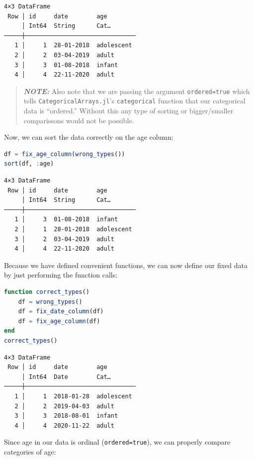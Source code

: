 \documentclass[
  notoc %
]{tufte-book}
\newcommand{\passthrough}[1]{#1}
\begin{document}
\begin{lstlisting}[language=Output]
4×3 DataFrame
 Row │ id     date        age
     │ Int64  String      Cat…
─────┼───────────────────────────────
   1 │     1  28-01-2018  adolescent
   2 │     2  03-04-2019  adult
   3 │     3  01-08-2018  infant
   4 │     4  22-11-2020  adult
\end{lstlisting}

\begin{quote}
\textbf{\emph{NOTE:}} Also note that we are passing the argument
\passthrough{\lstinline!ordered=true!} which tells
\passthrough{\lstinline!CategoricalArrays.jl!}'s
\passthrough{\lstinline!categorical!} function that our categorical data
is ``ordered.'' Without this any type of sorting or bigger/smaller
comparissons would not be possible.
\end{quote}

Now, we can sort the data correctly on the age column:

\begin{lstlisting}[language=Julia]
df = fix_age_column(wrong_types())
sort(df, :age)
\end{lstlisting}

\begin{lstlisting}[language=Output]
4×3 DataFrame
 Row │ id     date        age
     │ Int64  String      Cat…
─────┼───────────────────────────────
   1 │     3  01-08-2018  infant
   2 │     1  28-01-2018  adolescent
   3 │     2  03-04-2019  adult
   4 │     4  22-11-2020  adult
\end{lstlisting}

Because we have defined convenient functions, we can now define our
fixed data by just performing the function calls:

\begin{lstlisting}[language=Julia]
function correct_types()
    df = wrong_types()
    df = fix_date_column(df)
    df = fix_age_column(df)
end
correct_types()
\end{lstlisting}

\begin{lstlisting}[language=Output]
4×3 DataFrame
 Row │ id     date        age
     │ Int64  Date        Cat…
─────┼───────────────────────────────
   1 │     1  2018-01-28  adolescent
   2 │     2  2019-04-03  adult
   3 │     3  2018-08-01  infant
   4 │     4  2020-11-22  adult
\end{lstlisting}

Since age in our data is ordinal
(\passthrough{\lstinline!ordered=true!}), we can properly compare
categories of age:
\end{document}
